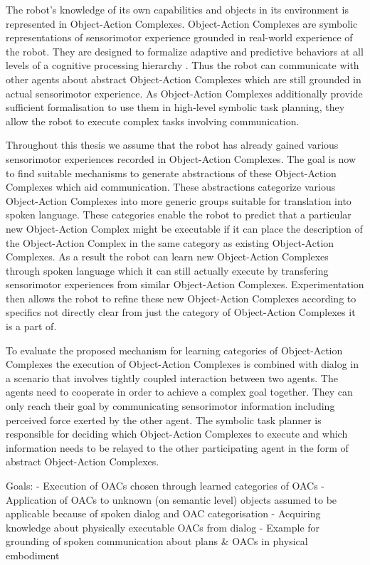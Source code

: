 \documentclass[english,ngerman]{KITreprt}
\begin{document}
The robot's knowledge of its own capabilities and objects in its environment is
represented in Object-Action Complexes. Object-Action Complexes are symbolic
representations of sensorimotor experience grounded in real-world experience of
the robot. They are designed to formalize adaptive and predictive behaviors at
all levels of a cognitive processing hierarchy \cite{Geib2011}. Thus the robot can
communicate with other agents about abstract Object-Action Complexes which are
still grounded in actual sensorimotor experience. As Object-Action Complexes
additionally provide sufficient formalisation to use them in high-level symbolic
task planning, they allow the robot to execute complex tasks involving
communication.

Throughout this thesis we assume that the robot has already gained various
sensorimotor experiences recorded in Object-Action Complexes. The goal is now to
find suitable mechanisms to generate abstractions of these Object-Action
Complexes which aid communication. These abstractions categorize various
Object-Action Complexes into more generic groups suitable for translation into
spoken language. These categories enable the robot to predict that a particular
new Object-Action Complex might be executable if it can place the description
of the Object-Action Complex in the same category as existing Object-Action
Complexes. As a result the robot can learn new Object-Action Complexes through
spoken language which it can still actually execute by transfering sensorimotor
experiences from similar Object-Action Complexes. Experimentation then allows
the robot to refine these new Object-Action Complexes according to specifics
not directly clear from just the category of Object-Action Complexes it is a
part of.

To evaluate the proposed mechanism for learning categories of Object-Action
Complexes the execution of Object-Action Complexes is combined with
dialog in a scenario that involves tightly coupled interaction between two
agents. The agents need to cooperate in order to achieve a complex goal
together. They can only reach their goal by communicating sensorimotor
information including perceived force exerted by the other agent. The symbolic
task planner is responsible for deciding which Object-Action Complexes to
execute and which information needs to be relayed to the other participating
agent in the form of abstract Object-Action Complexes.

Goals:
- Execution of OACs chosen through learned categories of OACs
- Application of OACs to unknown (on semantic level) objects assumed to be
  applicable because of spoken dialog and OAC categorisation
- Acquiring knowledge about physically executable OACs from dialog
  - Example for grounding of spoken communication about plans \& OACs
    in physical embodiment
\end{document}
